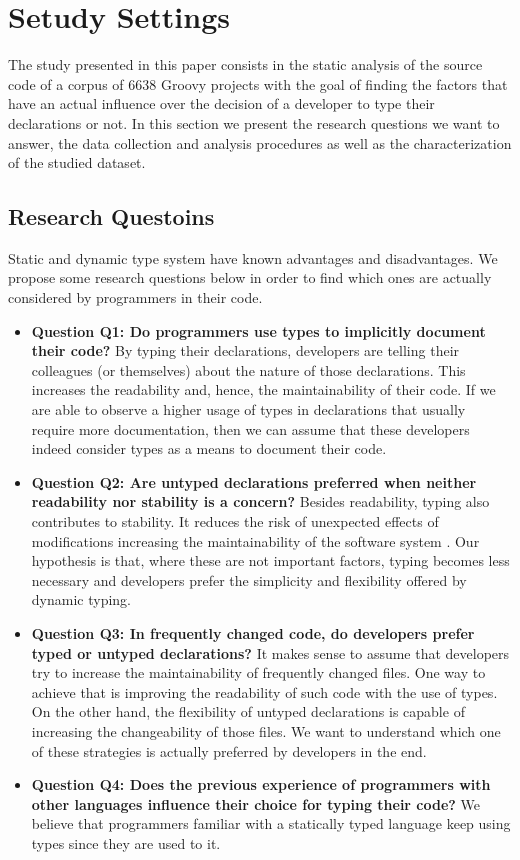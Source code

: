 \documentclass[preprint]{sigplanconf}
\begin{document}
%
%

\section{Setudy Settings\label{settings}}
The study presented in this paper consists in the static analysis of the source code of a corpus of 6638 Groovy projects with the goal of finding the factors that have an actual influence over the decision of a developer to type their declarations or not. 
In this section we present the research questions we want to answer, the data collection and analysis procedures as well as the characterization of the studied dataset.

\subsection{Research Questoins\label{questions}}
Static and dynamic type system have known advantages and disadvantages.
We propose some research questions below in order to find which ones are actually considered by programmers in their code.

\begin{itemize}
	\item \textbf{Question Q1: Do programmers use types to implicitly document their code?} By typing their declarations, developers are telling their colleagues (or themselves) about the nature of those declarations. This increases the readability and, hence, the maintainability of their code. If we are able to observe a higher usage of types in declarations that usually require more documentation, then we can assume that these developers indeed consider types as a means to document their code.
	\item \textbf{Question Q2: Are untyped declarations preferred when neither readability nor stability is a concern?} Besides readability, typing also contributes to stability. It reduces the risk of unexpected effects of modifications increasing the maintainability of the software system \cite{Iso2004}. Our hypothesis is that, where these are not important factors, typing becomes less necessary and developers prefer the simplicity and flexibility offered by dynamic typing. 
	\item \textbf{Question Q3: In frequently changed code, do developers prefer typed or untyped declarations?} It makes sense to assume that developers try to increase the maintainability of frequently changed files. One way to achieve that is improving the readability of such code with the use of types. On the other hand, the flexibility of untyped declarations is capable of increasing the changeability of those files. We want to understand which one of these strategies is actually preferred by developers in the end.
	\item \textbf{Question Q4: Does the previous experience of programmers with other languages influence their choice for typing their code?} We believe that programmers familiar with a statically typed language keep using types since they are used to it. 
\end{itemize}
\end{document}
